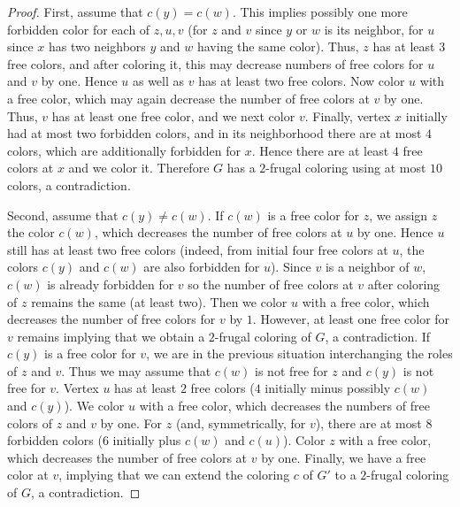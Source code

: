 \documentclass[10pt,a4paper]{article}
\begin{document}
\begin{proof}
First, assume that $c(y)=c(w)$. This implies possibly one more forbidden color for each of $z,u,v$ (for $z$ and $v$ since $y$ or $w$ is its neighbor, for $u$ since $x$ has two neighbors $y$ and $w$ having the same color). Thus, $z$ has at least $3$ free colors, and after coloring it, this may decrease numbers of free colors for $u$ and $v$ by one. Hence $u$ as well as $v$ has at least two free colors. Now color $u$ with a free color, which may again decrease the number of free colors at $v$ by one. Thus, $v$ has at least one free color, and we next color $v$. Finally, vertex $x$ initially had at most two forbidden colors, and in its neighborhood there are at most $4$ colors, which are additionally forbidden for $x$. Hence there are at least $4$ free colors at $x$ and we color it. Therefore $G$ has a $2$-frugal coloring using at most $10$ colors, a contradiction.

Second, assume that $c(y)\not=c(w)$. If $c(w)$ is a free color for $z$, we assign $z$ the color $c(w)$, which decreases the number of free colors at $u$ by one. Hence $u$ still has at least two free colors (indeed, from initial four free colors at $u$, the colors $c(y)$ and $c(w)$ are also forbidden for $u$). Since $v$ is a neighbor of $w$, $c(w)$ is already forbidden for $v$ so the number of free colors at $v$ after coloring of $z$ remains the same (at least two). Then we color $u$ with a free color, which decreases the number of free colors for $v$ by $1$. However, at least one free color for $v$ remains implying that we obtain a $2$-frugal coloring of $G$, a contradiction. If $c(y)$ is a free color for $v$, we are in the previous situation interchanging the roles of $z$ and $v$. Thus we may assume that $c(w)$ is not free for $z$ and $c(y)$ is not free for $v$. Vertex $u$ has at least $2$ free colors ($4$ initially minus possibly $c(w)$ and $c(y)$). We color $u$ with a free color, which decreases the numbers of free colors of $z$ and $v$ by one. For $z$ (and, symmetrically, for $v$), there are at most $8$ forbidden colors (6 initially plus $c(w)$ and $c(u)$). Color $z$ with a free color, which decreases the number of free colors at $v$ by one. Finally, we have a free color at $v$, implying that we can extend the coloring $c$ of $G'$ to a $2$-frugal coloring of $G$, a contradiction.
\end{proof}
\end{document}
